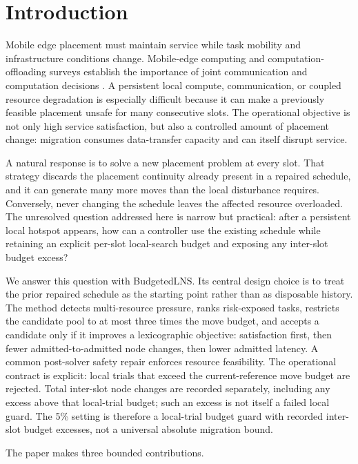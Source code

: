 \documentclass[preprint,12pt]{elsarticle}
\begin{document}
\section{Introduction}\label{introduction}

Mobile edge placement must maintain service while task mobility and
infrastructure conditions change. Mobile-edge computing and
computation-offloading surveys establish the importance of joint
communication and computation decisions
\citep{mach2017mec, mao2017survey}. A persistent local compute,
communication, or coupled resource degradation is especially difficult
because it can make a previously feasible placement unsafe for many
consecutive slots. The operational objective is not only high service
satisfaction, but also a controlled amount of placement change:
migration consumes data-transfer capacity and can itself disrupt
service.

A natural response is to solve a new placement problem at every slot.
That strategy discards the placement continuity already present in a
repaired schedule, and it can generate many more moves than the local
disturbance requires. Conversely, never changing the schedule leaves the
affected resource overloaded. The unresolved question addressed here is
narrow but practical: after a persistent local hotspot appears, how can
a controller use the existing schedule while retaining an explicit
per-slot local-search budget and exposing any inter-slot budget excess?

We answer this question with BudgetedLNS. Its central design choice is
to treat the prior repaired schedule as the starting point rather than
as disposable history. The method detects multi-resource pressure, ranks
risk-exposed tasks, restricts the candidate pool to at most three times
the move budget, and accepts a candidate only if it improves a
lexicographic objective: satisfaction first, then fewer admitted-to-admitted
node changes, then
lower admitted latency. A common post-solver safety repair enforces resource
feasibility. The operational contract is explicit: local trials that
exceed the current-reference move budget are rejected. Total inter-slot
node changes are recorded separately, including any excess above that
local-trial budget; such an excess is not itself a failed local guard.
The 5\% setting is therefore a local-trial budget guard with recorded
inter-slot budget excesses, not a universal absolute migration bound.

The paper makes three bounded contributions.
\end{document}
